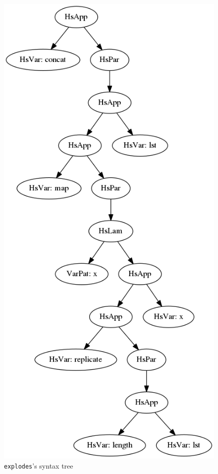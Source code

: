 \begin{figure}[!h]\label{explode}
	\begin{center}
		\includegraphics[scale=.5]{graphVis/Chapter3/explode.png}
	\end{center}
	\caption{\texttt{explodes}'s syntax tree}
\end{figure}

